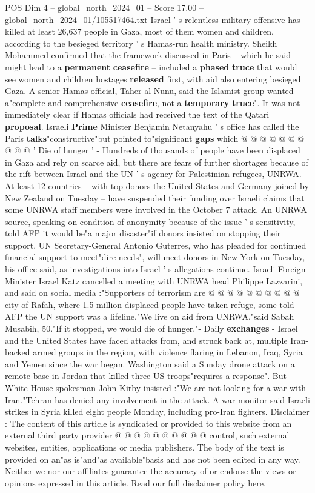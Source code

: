 \begin{textsample}{POS Dim 4 – global\_north\_2024\_01 – Score 17.00 – global\_north\_2024\_01/105517464.txt}
Israel ' s relentless military offensive has killed at least 26,637 people in Gaza, most of them women and children, according to the besieged territory ' s Hamas-run health ministry.
Sheikh Mohammed confirmed that the framework discussed in Paris -- which he said might lead to a \textbf{permanent} \textbf{ceasefire} -- included a \textbf{phased} \textbf{truce} that would see women and children hostages \textbf{released} first, with aid also entering besieged Gaza.
A senior Hamas official, Taher al-Nunu, said the Islamist group wanted a"complete and comprehensive \textbf{ceasefire}, not a \textbf{temporary} \textbf{truce}".
It was not immediately clear if Hamas officials had received the text of the Qatari \textbf{proposal}.
Israeli \textbf{Prime} Minister Benjamin Netanyahu ' s office has called the Paris \textbf{talks}"constructive"but pointed to"significant \textbf{gaps} which @ @ @ @ @ @ @ @ @ @ ' Die of hunger ' - Hundreds of thousands of people have been displaced in Gaza and rely on scarce aid, but there are fears of further shortages because of the rift between Israel and the UN ' s agency for Palestinian refugees, UNRWA.
At least 12 countries -- with top donors the United States and Germany joined by New Zealand on Tuesday -- have suspended their funding over Israeli claims that some UNRWA staff members were involved in the October 7 attack.
An UNRWA source, speaking on condition of anonymity because of the issue ' s sensitivity, told AFP it would be"a major disaster"if donors insisted on stopping their support.
UN Secretary-General Antonio Guterres, who has pleaded for continued financial support to meet"dire needs", will meet donors in New York on Tuesday, his office said, as investigations into Israel ' s allegations continue.
Israeli Foreign Minister Israel Katz cancelled a meeting with UNRWA head Philippe Lazzarini, and said on social media :"Supporters of terrorism are @ @ @ @ @ @ @ @ @ @ city of Rafah, where 1.5 million displaced people have taken refuge, some told AFP the UN support was a lifeline."We live on aid from UNRWA,"said Sabah Musabih, 50."If it stopped, we would die of hunger."- Daily \textbf{exchanges} - Israel and the United States have faced attacks from, and struck back at, multiple Iran-backed armed groups in the region, with violence flaring in Lebanon, Iraq, Syria and Yemen since the war began.
Washington said a Sunday drone attack on a remote base in Jordan that killed three US troops"requires a response".
But White House spokesman John Kirby insisted :"We are not looking for a war with Iran."Tehran has denied any involvement in the attack.
A war monitor said Israeli strikes in Syria killed eight people Monday, including pro-Iran fighters.
Disclaimer : The content of this article is syndicated or provided to this website from an external third party provider @ @ @ @ @ @ @ @ @ @ control, such external websites, entities, applications or media publishers.
The body of the text is provided on an"as is"and"as available"basis and has not been edited in any way.
Neither we nor our affiliates guarantee the accuracy of or endorse the views or opinions expressed in this article.
Read our full disclaimer policy here.


\end{textsample}
